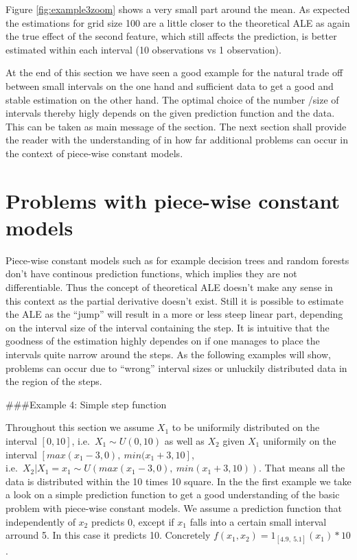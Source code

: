 \documentclass[
]{krantz}
\begin{document}
Figure \ref{fig:example3zoom} shows a very small part around the mean.
As expected the estimations for grid size 100 are a little closer to the theoretical ALE as again the true effect of the second feature, which still affects the prediction, is better estimated within each interval (10 observations vs 1 observation).

At the end of this section we have seen a good example for the natural trade off between small intervals on the one hand and sufficient data to get a good and stable estimation on the other hand. The optimal choice of the number /size of intervals thereby higly depends on the given prediction function and the data. This can be taken as main message of the section. The next section shall provide the reader with the understanding of in how far additional problems can occur in the context of piece-wise constant models.

\hypertarget{problems-with-piece-wise-constant-models}{%
\section{Problems with piece-wise constant models}\label{problems-with-piece-wise-constant-models}}

Piece-wise constant models such as for example decision trees and random forests don't have continous prediction functions, which implies they are not differentiable. Thus the concept of theoretical ALE doesn't make any sense in this context as the partial derivative doesn't exist. Still it is possible to estimate the ALE as the ``jump'' will result in a more or less steep linear part, depending on the interval size of the interval containing the step. It is intuitive that the goodness of the estimation highly dependes on if one manages to place the intervals quite narrow around the steps.
As the following examples will show, problems can occur due to ``wrong'' interval sizes or unluckily distributed data in the region of the steps.

\#\#\#Example 4: Simple step function

Throughout this section we assume \(X_1\) to be uniformily distributed on the interval \([0,10]\), i.e.~\(X_1 \sim U(0,10)\) as well as \(X_2\) given \(X_1\) uniformily on the interval \([max(x_1 - 3, 0),~min( x_1 + 3, 10]\),\\
i.e.~\(X_2 \vert X_1 = x_1 \sim U(max(x_1 - 3, 0),~min( x_1 + 3, 10) )\). That means all the data is distributed within the 10 times 10 square.
In the the first example we take a look on a simple prediction function to get a good understanding of the basic problem with piece-wise constant models. We assume a prediction function that independently of \(x_2\) predicts 0, except if \(x_1\) falls into a certain small interval arround 5. In this case it predicts 10. Concretely \(f(x_1, x_2) = 1_{[4.9,~5.1]}(x_1) * 10\).
\end{document}
